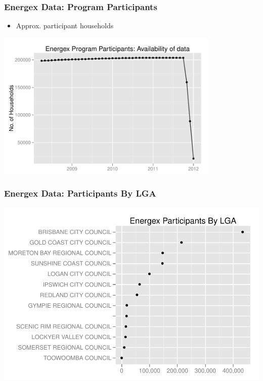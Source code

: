 \documentclass{beamer}
\begin{document}
\begin{frame}
\frametitle{Energex Data: Program Participants}
\begin{itemize}
\item Approx.  participant households
\end{itemize}
\begin{center}
\includegraphics[width=0.8\textwidth]{figures/EnergexPartAvailData}
\end{center}
\end{frame}

\begin{frame}
\frametitle{Energex Data: Participants By LGA}
\begin{center}
\includegraphics[width=1\textwidth]{figures/EnergexLGA}
\end{center}
\end{frame}
\end{document}
